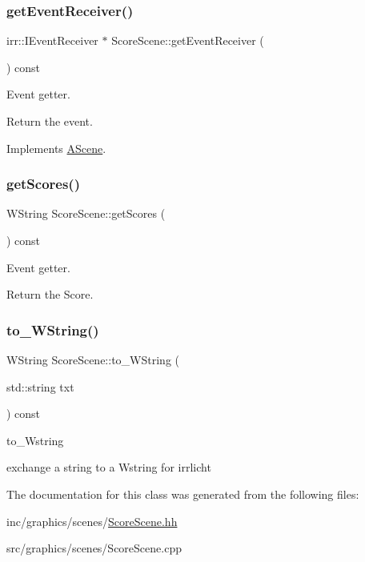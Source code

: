\subsubsection{\texorpdfstring{get\+Event\+Receiver()}{getEventReceiver()}}
{\footnotesize\ttfamily irr\+::\+I\+Event\+Receiver $\ast$ Score\+Scene\+::get\+Event\+Receiver (\begin{DoxyParamCaption}{ }\end{DoxyParamCaption}) const\hspace{0.3cm}{\ttfamily [virtual]}}



Event getter. 

Return the event. 

Implements \hyperlink{classAScene_af521e5e6d30a5d2e5d30eb333e4d3abd}{A\+Scene}.

\mbox{\label{classScoreScene_af82d6c841dc42c42d83202d2c7ddf8c9}} 
\subsubsection{\texorpdfstring{get\+Scores()}{getScores()}}
{\footnotesize\ttfamily W\+String Score\+Scene\+::get\+Scores (\begin{DoxyParamCaption}{ }\end{DoxyParamCaption}) const}



Event getter. 

Return the Score. \mbox{\label{classScoreScene_a7cd50a0bd9be501c08f3f2855d61830e}} 
\subsubsection{\texorpdfstring{to\+\_\+\+W\+String()}{to\_WString()}}
{\footnotesize\ttfamily W\+String Score\+Scene\+::to\+\_\+\+W\+String (\begin{DoxyParamCaption}\item[{std\+::string}]{txt }\end{DoxyParamCaption}) const}



to\+\_\+\+Wstring 

exchange a string to a Wstring for irrlicht 

The documentation for this class was generated from the following files\+:\begin{DoxyCompactItemize}
\item 
inc/graphics/scenes/\hyperlink{ScoreScene_8hh}{Score\+Scene.\+hh}\item 
src/graphics/scenes/Score\+Scene.\+cpp\end{DoxyCompactItemize}
